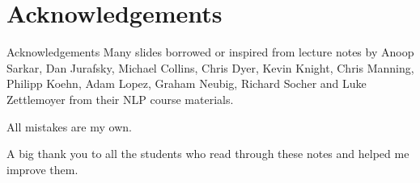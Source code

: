 
\section*{Acknowledgements}

\begin{frame}
\centering
\begin{alertblock}{Acknowledgements}
Many slides borrowed or inspired from lecture notes by Anoop Sarkar, Dan Jurafsky, Michael Collins, Chris Dyer, Kevin Knight, Chris Manning, Philipp Koehn, Adam Lopez, Graham Neubig, Richard Socher and Luke Zettlemoyer from their NLP course materials. 

\bigskip

All mistakes are my own.

\bigskip

A big thank you to all the students who read through these notes and helped me improve them.

\end{alertblock}
\end{frame}

